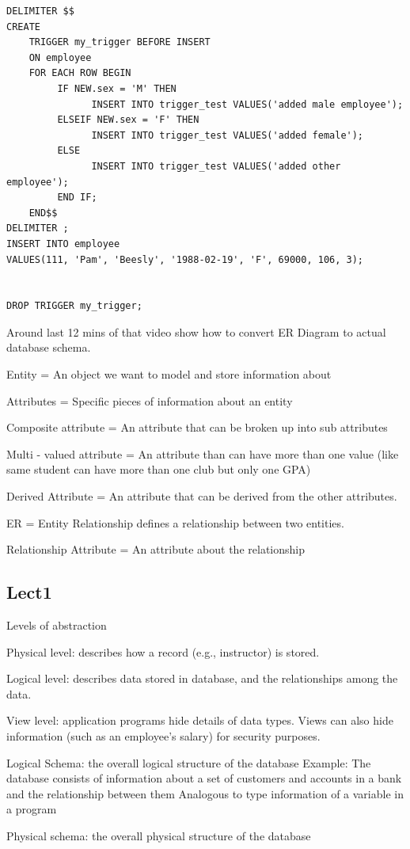 \documentclass[8pt, a4paper, oneside, twocolumn]{extarticle}
\begin{document}
\begin{verbatim}
DELIMITER $$
CREATE
    TRIGGER my_trigger BEFORE INSERT
    ON employee
    FOR EACH ROW BEGIN 
         IF NEW.sex = 'M' THEN
               INSERT INTO trigger_test VALUES('added male employee');
         ELSEIF NEW.sex = 'F' THEN
               INSERT INTO trigger_test VALUES('added female');
         ELSE
               INSERT INTO trigger_test VALUES('added other employee');
         END IF;
    END$$
DELIMITER ;
INSERT INTO employee
VALUES(111, 'Pam', 'Beesly', '1988-02-19', 'F', 69000, 106, 3);


DROP TRIGGER my_trigger;
\end{verbatim}
Around last 12 mins of that video show how to convert ER Diagram to actual database schema.

Entity = An object we want to model and store information about

Attributes = Specific pieces of information about an entity

Composite attribute = An attribute that can be broken up into sub attributes

Multi - valued attribute = An attribute than can have more than one value (like same student can have more than one club but only one GPA)

Derived Attribute = An attribute that can be derived from the other attributes.

ER = Entity Relationship defines a relationship between two entities.

Relationship Attribute = An attribute about the relationship

\subsection{Lect1}
Levels of abstraction

Physical level: describes how a record (e.g., instructor) is stored.

Logical level: describes data stored in database, and the relationships among 
the data.

View level: application programs hide details of data types.  Views can also 
hide information (such as an employee’s salary) for security purposes. 

Logical Schema: the overall logical structure of the database 
Example: The database consists of information about a set of customers and 
accounts in a bank and the relationship between them
Analogous to type information of a variable in a program

Physical schema: the overall physical structure of the database 
\end{document}
